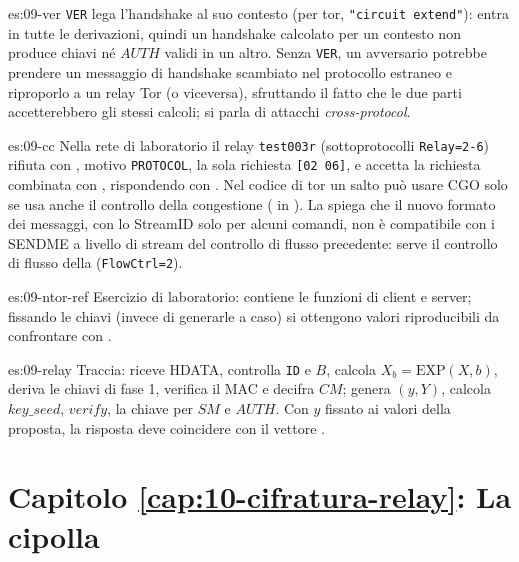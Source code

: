 \begin{soluzione}{es:09-ver}
\texttt{VER} lega l'handshake al suo contesto (per tor, \texttt{"circuit extend"}): entra in tutte le derivazioni, quindi un handshake calcolato per un contesto non produce chiavi né $\mathit{AUTH}$ validi in un altro. Senza \texttt{VER}, un avversario potrebbe prendere un messaggio di handshake scambiato nel protocollo estraneo e riproporlo a un relay Tor (o viceversa), sfruttando il fatto che le due parti accetterebbero gli stessi calcoli; si parla di attacchi \emph{cross-protocol}.
\end{soluzione}

\begin{soluzione}{es:09-cc}
Nella rete di laboratorio il relay \texttt{test003r} (sottoprotocolli \texttt{Relay=2-6}) rifiuta con , motivo \texttt{PROTOCOL}, la sola richiesta \texttt{[02 06]}, e accetta la richiesta combinata con , rispondendo con . Nel codice di tor un salto può usare CGO solo se usa anche il controllo della congestione ( in ). La  spiega che il nuovo formato dei messaggi, con lo StreamID solo per alcuni comandi, non è compatibile con i SENDME a livello di stream del controllo di flusso precedente: serve il controllo di flusso della  (\texttt{FlowCtrl=2}).
\end{soluzione}

\begin{soluzione}{es:09-ntor-ref}
Esercizio di laboratorio:  contiene le funzioni di client e server; fissando le chiavi (invece di generarle a caso) si ottengono valori riproducibili da confrontare con .
\end{soluzione}

\begin{soluzione}{es:09-relay}
Traccia:  riceve HDATA, controlla \texttt{ID} e $B$, calcola $X_b = \mathrm{EXP}(X, b)$, deriva le chiavi di fase 1, verifica il MAC e decifra $CM$;  genera $(y, Y)$, calcola $\mathit{key\_seed}$, $\mathit{verify}$, la chiave per $SM$ e $\mathit{AUTH}$. Con $y$ fissato ai valori della proposta, la risposta deve coincidere con il vettore .
\end{soluzione}

\section*{Capitolo \ref{cap:10-cifratura-relay}: La cipolla}

